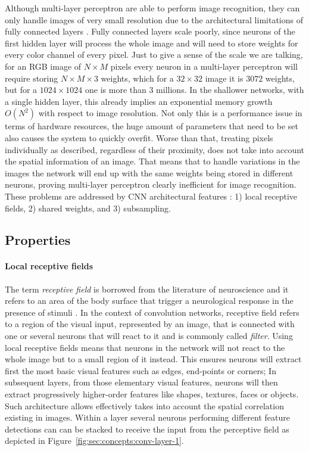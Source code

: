 Although multi-layer perceptron are able to perform image recognition, they can only handle images of very small resolution due to the architectural limitations of fully connected layers \cite{ZHANG1999}.
Fully connected layers scale poorly, since neurons of the first hidden layer will process the whole image and will need to store weights for every color channel of every pixel.
Just to give a sense of the scale we are talking, for an RGB image of ${N}\times{M}$ pixels every neuron in a multi-layer perceptron will require storing ${N}\times{M}\times{3}$ weights, which for a ${32}\times{32}$ image it is $3072$ weights, but for a ${1024}\times{1024}$ one is more than $3$ millions.
In the shallower networks, with a single hidden layer, this already implies an exponential memory growth $O(N^2)$ with respect to image resolution.
Not only this is a performance issue in terms of hardware resources, the huge amount of parameters that need to be set also causes the system to quickly overfit.
Worse than that, treating pixels individually as described, regardless of their proximity, does not take into account the spatial information of an image.
That means that to handle variations in the images the network will end up with the same weights being stored in different neurons, proving multi-layer perceptron clearly inefficient for image recognition.
These problems are addressed by CNN architectural features \cite{LeCun1998}: 1) local receptive fields, 2) shared weights, and 3) subsampling.


\subsection{Properties}
\label{sub:concepts:convnets:properties}

\paragraph{Local receptive fields}
The term \emph{receptive field} is borrowed from the literature of neuroscience and it refers to an area of the body surface that trigger a neurological response in the presence of stimuli \cite{Sherrington1906,Alonso2008}.
In the context of convolution networks, receptive field refers to a region of the visual input, represented by an image, that is connected with one or several neurons that will react to it and is commonly called \emph{filter}.
Using local receptive fields means that neurons in the network will not react to the whole image but to a small region of it instead.
This ensures neurons will extract first the most basic visual features such as edges, end-points or corners;
In subsequent layers, from those elementary visual features, neurons will then extract progressively higher-order features like shapes, textures, faces or objects.
Such architecture allows effectively takes into account the spatial correlation existing in images.
Within a layer several neurons performing different feature detections can can be stacked to receive the input from the perceptive field as depicted in Figure~\ref{fig:sec:concepts:conv-layer-1}.

